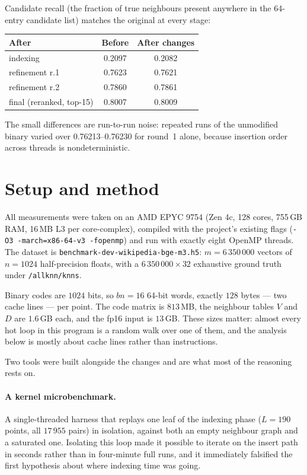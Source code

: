 \documentclass[11pt,a4paper]{article}
\newcommand{\code}[1]{\texttt{\small #1}}
\begin{document}
\noindent
Candidate recall (the fraction of true neighbours present anywhere in the
64-entry candidate list) matches the original at every stage:

\begin{center}
\begin{tabular}{lcc}
\toprule
After & Before & After changes \\
\midrule
indexing        & 0.2097 & 0.2082 \\
refinement r.1  & 0.7623 & 0.7621 \\
refinement r.2  & 0.7860 & 0.7861 \\
\midrule
final (reranked, top-15) & 0.8007 & 0.8009 \\
\bottomrule
\end{tabular}
\end{center}

\noindent
The small differences are run-to-run noise: repeated runs of the unmodified
binary varied over 0.76213--0.76230 for round~1 alone, because
insertion order across threads is nondeterministic.

\section{Setup and method}

All measurements were taken on an AMD EPYC 9754 (Zen 4c, 128 cores, 755\,GB
RAM, 16\,MB L3 per core-complex), compiled with the project's existing flags
(\code{-O3 -march=x86-64-v3 -fopenmp}) and run with exactly eight OpenMP
threads. The dataset is \code{benchmark-dev-wikipedia-bge-m3.h5}:
$m = 6\,350\,000$ vectors of $n = 1024$ half-precision floats, with a
$6\,350\,000 \times 32$ exhaustive ground truth under \code{/allknn/knns}.

Binary codes are $1024$ bits, so $bn = 16$ 64-bit words, exactly $128$ bytes ---
two cache lines --- per point. The code matrix is $813$\,MB, the neighbour
tables $V$ and $D$ are $1.6$\,GB each, and the fp16 input is $13$\,GB. These
sizes matter: almost every hot loop in this program is a random walk over one of
them, and the analysis below is mostly about cache lines rather than
instructions.

Two tools were built alongside the changes and are what most of the reasoning
rests on.

\paragraph{A kernel microbenchmark.} A single-threaded harness that replays one
leaf of the indexing phase ($L = 190$ points, all $17\,955$ pairs) in isolation,
against both an empty neighbour graph and a saturated one. Isolating this loop
made it possible to iterate on the insert path in seconds rather than in
four-minute full runs, and it immediately falsified the first hypothesis about
where indexing time was going.
\end{document}

